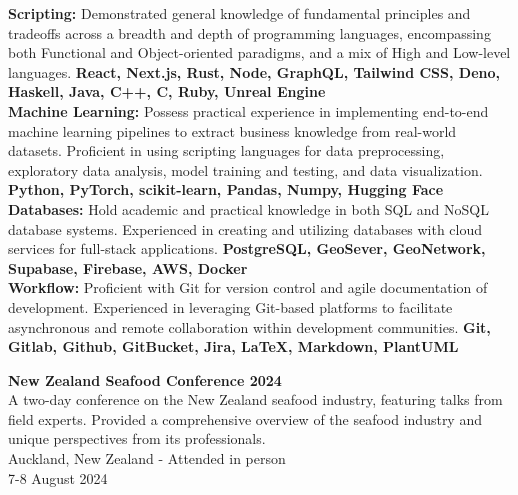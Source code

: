 \documentclass[9pt]{developercv}
\begin{document}


\textbf{Scripting:} Demonstrated general knowledge of fundamental principles and tradeoffs across a breadth and depth of programming languages, encompassing both Functional and Object-oriented paradigms, and a mix of High and Low-level languages. \textbf{React, Next.js, Rust, Node, GraphQL, Tailwind CSS, Deno, Haskell, Java, C++, C, Ruby, Unreal Engine} \\

\textbf{Machine Learning:} Possess practical experience in implementing end-to-end machine learning pipelines to extract business knowledge from real-world datasets. Proficient in using scripting languages for data preprocessing, exploratory data analysis, model training and testing, and data visualization. \textbf{Python, PyTorch, scikit-learn, Pandas, Numpy, Hugging Face} \\

\textbf{Databases:} Hold academic and practical knowledge in both SQL and NoSQL database systems. Experienced in creating and utilizing databases with cloud services for full-stack applications. \textbf{PostgreSQL, GeoSever, GeoNetwork, Supabase, Firebase, AWS, Docker} \\

\textbf{Workflow:} Proficient with Git for version control and agile documentation of development. Experienced in leveraging Git-based platforms to facilitate asynchronous and remote collaboration within development communities. \textbf{Git, Gitlab, Github, GitBucket, Jira, LaTeX, Markdown, PlantUML} \\


\textbf{New Zealand Seafood Conference 2024} \\
A two-day conference on the New Zealand seafood industry, featuring talks from field experts. Provided a comprehensive overview of the seafood industry and unique perspectives from its professionals. \\
Auckland, New Zealand - Attended in person \\
7-8 August 2024 \\
\end{document}
